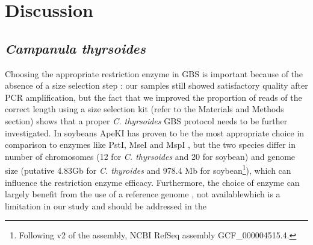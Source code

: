 \documentclass[a4paper, 12pt]{report}
\begin{document}
\clearpage
\chapter{Discussion}

\section{\textit{Campanula thyrsoides}}
Choosing the appropriate restriction enzyme in GBS is important because of the absence of a size selection step \parencite{sonahImprovedGenotypingSequencing2013}: our samples still showed satisfactory quality after PCR amplification, but the fact that we improved the proportion of reads of the correct length using a size selection kit (refer to the Materials and Methods section) shows that a proper \textit{C. thyrsoides} GBS protocol needs to be further investigated. In soybeans ApeKI has proven to be the most appropriate choice in comparison to enzymes like PstI, MseI and MspI \parencite{sonahImprovedGenotypingSequencing2013}, but the two species differ in number of chromosomes (12 for \textit{C. thyrsoides} and 20 for soybean) and genome size (putative 4.83Gb for \textit{C. thyroides} and 978.4 Mb for soybean\footnote{Following v2 of the assembly, NCBI RefSeq assembly GCF\_000004515.4.}), which can influence the restriction enzyme efficacy. Furthermore, the choice of enzyme can largely benefit from the use of a reference genome \parencite{sonahImprovedGenotypingSequencing2013},  not availablewhich is a limitation in our study and should be addressed in the 
\end{document}
